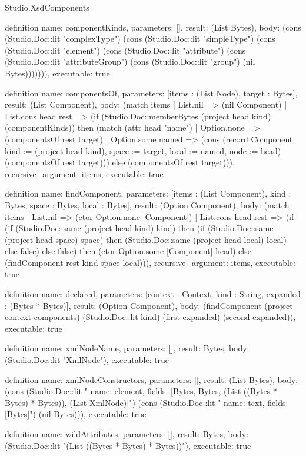 \begin{lexlean}{Studio.XsdComponents}
\begin{semanticmodule}
definition{
  name: componentKinds,
  parameters: [],
  result: (List Bytes),
  body: (cons (Studio.Doc::lit "complexType") (cons (Studio.Doc::lit "simpleType") (cons (Studio.Doc::lit "element") (cons (Studio.Doc::lit "attribute") (cons (Studio.Doc::lit "attributeGroup") (cons (Studio.Doc::lit "group") (nil Bytes))))))),
  executable: true
}

definition{
  name: componentsOf,
  parameters: [items : (List Node), target : Bytes],
  result: (List Component),
  body: (match items
    | List.nil => (nil Component)
    | List.cons head rest => (if (Studio.Doc::memberBytes (project head kind) (componentKinds)) then (match (attr head "name")
      | Option.none => (componentsOf rest target)
      | Option.some named => (cons (record Component {kind := (project head kind), space := target, local := named, node := head}) (componentsOf rest target))) else (componentsOf rest target))),
  recursive_argument: items,
  executable: true
}

definition{
  name: findComponent,
  parameters: [items : (List Component), kind : Bytes, space : Bytes, local : Bytes],
  result: (Option Component),
  body: (match items
    | List.nil => (ctor Option.none [Component])
    | List.cons head rest => (if (if (Studio.Doc::same (project head kind) kind) then (if (Studio.Doc::same (project head space) space) then (Studio.Doc::same (project head local) local) else false) else false) then (ctor Option.some [Component] head) else (findComponent rest kind space local))),
  recursive_argument: items,
  executable: true
}

definition{
  name: declared,
  parameters: [context : Context, kind : String, expanded : (Bytes * Bytes)],
  result: (Option Component),
  body: (findComponent (project context components) (Studio.Doc::lit kind) (first expanded) (second expanded)),
  executable: true
}

definition{
  name: xmlNodeName,
  parameters: [],
  result: Bytes,
  body: (Studio.Doc::lit "XmlNode"),
  executable: true
}

definition{
  name: xmlNodeConstructors,
  parameters: [],
  result: (List Bytes),
  body: (cons (Studio.Doc::lit "    {name: element, fields: [Bytes, Bytes, (List ((Bytes * Bytes) * Bytes)), (List XmlNode)]}") (cons (Studio.Doc::lit "    {name: text, fields: [Bytes]}") (nil Bytes))),
  executable: true
}

definition{
  name: wildAttributes,
  parameters: [],
  result: Bytes,
  body: (Studio.Doc::lit "(List ((Bytes * Bytes) * Bytes))"),
  executable: true
}


\end{semanticmodule}
\end{lexlean}
